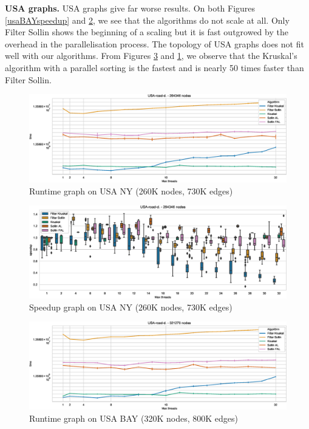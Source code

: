 \documentclass[letterpaper]{article}
\newcommand{\mypar}[1]{{\bf #1.}}
\begin{document}
\mypar{USA graphs} USA graphs give far worse results. On both Figures \ref{usaBAYspeedup} and \ref{usaNYspeedup}, we see that the algorithms do not scale at all. Only Filter Sollin shows the beginning of a scaling but it is fast outgrowed by the overhead in the parallelisation process. The topology of USA graphs does not fit well with our algorithms. From Figures \ref{usaBAYruntime} and \ref{usaNYruntime}, we observe that the Kruskal's algorithm with a parallel sorting is the fastest and is nearly 50 times faster than Filter Sollin.

\begin{figure}\centering
  \includegraphics[width=\linewidth]{graphics/Graph_runtime_USA-road-d._264346.eps}
  \caption{Runtime graph on USA NY (260K nodes, 730K edges)\label{usaNYruntime}}
\end{figure}

\begin{figure}\centering
  \includegraphics[width=\linewidth]{graphics/Box_Speedup_USA-road-d._264346.eps}
  \caption{Speedup graph on USA NY (260K nodes, 730K edges)\label{usaNYspeedup}}
\end{figure}
  
\begin{figure}\centering
  \includegraphics[width=\linewidth]{graphics/Graph_runtime_USA-road-d._321270.eps}
  \caption{Runtime graph on USA BAY (320K nodes, 800K edges)\label{usaBAYruntime}}
\end{figure}
\end{document}
